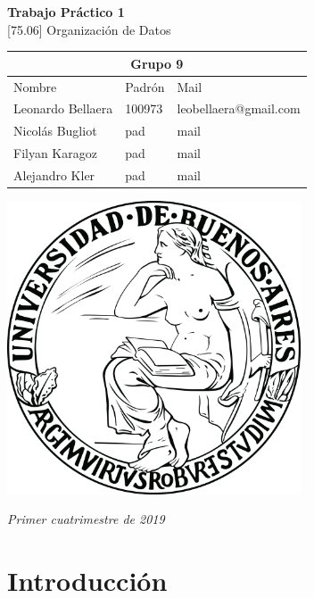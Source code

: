 \documentclass[titlepage,a4paper]{article}
\begin{document}
\begin{titlepage} %
    \centering
    \vfill
    \Huge \textbf{Trabajo Práctico 1} \\
    
    \vskip1cm
    \Huge [75.06] Organización de Datos\\
    \vskip2cm
    \begin{table}[htbp]
	\begin{center}
	\begin{adjustbox}{max width=\textwidth}
	\begin{tabular}{|l|l|l|}
	\hline
    \multicolumn{3}{|c|}{Grupo 9} \\ \hline
	Nombre & Padrón & Mail \\ \hline 
    Leonardo Bellaera & 100973 & leobellaera@gmail.com \\ \hline 
    Nicolás Bugliot & pad  & mail \\ \hline
    Filyan Karagoz &  pad & mail \\ \hline
    Alejandro Kler &  pad & mail \\ \hline
    \end{tabular}
    \end{adjustbox}
    \vskip 2cm
    \includegraphics[width=8.7cm, height=8.7cm]{UBA.png}
	\label{tabla:sencilla}
	\end{center}
	\end{table}
	\vskip1cm
	\Large \textit{Primer cuatrimestre de 2019}

    \vfill
\end{titlepage}
\tableofcontents %
\newpage

\section{Introducción}\label{sec:intro}
\end{document}
